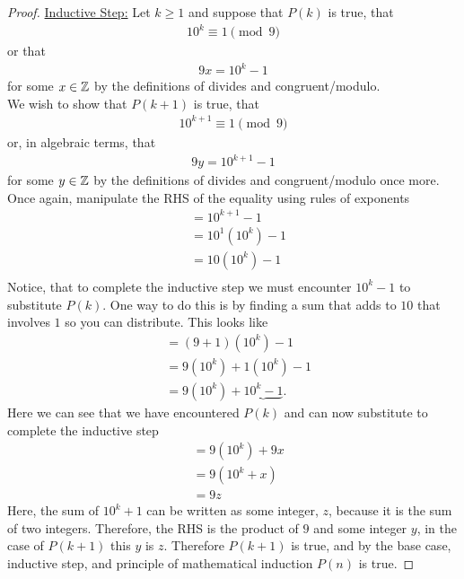 \documentclass{article}
\begin{document}
\begin{proof}
\underline{Inductive Step:} Let $k\geq 1$ and suppose that $P(k)$ is true, that 
\begin{align*}
    10^k \equiv 1 \pmod{9}
\end{align*}
or that 
\begin{align*}
    9x = 10^k - 1
\end{align*}
for some $x\in\Bbb{Z}$ by the definitions of divides and congruent/modulo.\\
We wish to show that $P(k+1)$ is true, that
\begin{align*}
    10^{k+1} \equiv 1 \pmod{9}
\end{align*}
or, in algebraic terms, that 
\begin{align*}
    9y = 10^{k+1} - 1
\end{align*}
for some $y\in\Bbb{Z}$ by the definitions of divides and congruent/modulo once more. Once again, manipulate the RHS of the equality using rules of exponents
\begin{align*}
    &= 10^{k+1} - 1\\
    &= 10^1(10^k) - 1\\
    &= 10(10^k) - 1\\
\end{align*}
Notice, that to complete the inductive step we must encounter $10^k - 1$ to substitute $P(k)$. One way to do this is by finding a sum that adds to $10$ that involves $1$ so you can distribute. This looks like
\begin{align*}
    &= (9+1)(10^k) - 1\\
    &= 9(10^k) + 1(10^k) - 1\\
    &= 9(10^k) + \underbrace{10^k - 1}.
\end{align*}
Here we can see that we have encountered $P(k)$ and can now substitute to complete the inductive step
\begin{align*}
    &= 9(10^k) + 9x\\
    &= 9(10^k + x)\\
    &= 9z
\end{align*}
Here, the sum of $10^k + 1$ can be written as some integer, $z$, because it is the sum of two integers. Therefore, the RHS is the product of $9$ and some integer $y$, in the case of $P(k+1)$ this $y$ is $z$. Therefore $P(k+1)$ is true, and by the base case, inductive step, and principle of mathematical induction $P(n)$ is true.
    \end{proof}
\end{document}
